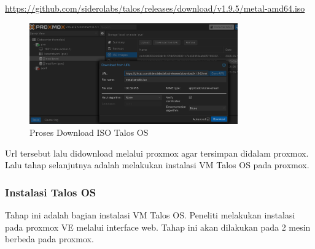 \url{https://github.com/siderolabs/talos/releases/download/v1.9.5/metal-amd64.iso}

\begin{figure}[H]
  \centering
  \includegraphics[width=0.8\textwidth]{figures/talos-install-1.jpg}
  \caption{Proses Download ISO Talos OS}
  \label{fig:talos_download}
\end{figure}

Url tersebut lalu didownload melalui proxmox agar tersimpan didalam proxmox. Lalu tahap selanjutnya adalah melakukan instalasi VM Talos OS pada proxmox.

\subsubsection{Instalasi Talos OS}
Tahap ini adalah bagian instalasi VM Talos OS. Peneliti melakukan instalasi pada proxmox VE melalui interface web.
Tahap ini akan dilakukan pada 2 mesin berbeda pada proxmox.


